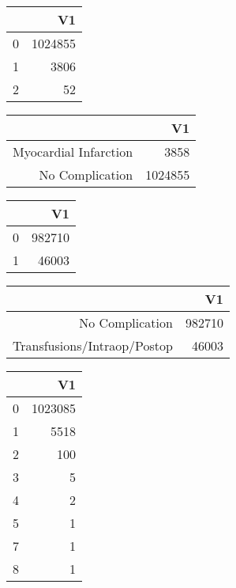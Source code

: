 \bigskip\bigskip
\centering
\begin{tabular}{rr}
  \hline
 & V1 \\ 
  \hline
0 & 1024855 \\ 
  1 & 3806 \\ 
  2 &  52 \\ 
   \hline
\end{tabular}

\bigskip\bigskip
\centering
\begin{tabular}{rr}
  \hline
 & V1 \\ 
  \hline
Myocardial Infarction & 3858 \\ 
  No Complication & 1024855 \\ 
   \hline
\end{tabular}

\bigskip\bigskip
\centering
\begin{tabular}{rr}
  \hline
 & V1 \\ 
  \hline
0 & 982710 \\ 
  1 & 46003 \\ 
   \hline
\end{tabular}

\bigskip\bigskip
\centering
\begin{tabular}{rr}
  \hline
 & V1 \\ 
  \hline
No Complication & 982710 \\ 
  Transfusions/Intraop/Postop & 46003 \\ 
   \hline
\end{tabular}

\bigskip\bigskip
\centering
\begin{tabular}{rr}
  \hline
 & V1 \\ 
  \hline
0 & 1023085 \\ 
  1 & 5518 \\ 
  2 & 100 \\ 
  3 &   5 \\ 
  4 &   2 \\ 
  5 &   1 \\ 
  7 &   1 \\ 
  8 &   1 \\ 
   \hline
\end{tabular}

